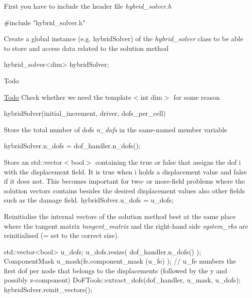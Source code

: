 \begin{DoxyItemize}
\item First you have to include the header file {\itshape hybrid\+\_\+solver.\+h} 
\begin{DoxyCode}
\textcolor{preprocessor}{#include "hybrid\_solver.h"}
\end{DoxyCode}

\item Create a global instance (e.\+g. hybrid\+Solver) of the {\itshape hybrid\+\_\+solver} class to be able to store and access data related to the solution method 
\begin{DoxyCode}
hybrid\_solver<dim> hybridSolver;
\end{DoxyCode}
 \begin{DoxyRefDesc}{Todo}
\item[\hyperlink{todo__todo000002}{Todo}]Check whether we need the template$<$int dim$>$ for some reason\end{DoxyRefDesc}

\begin{DoxyCode}
hybridSolver(initial\_increment, driver, dofs\_per\_cell)
\end{DoxyCode}

\item Store the total number of dofs {\itshape n\+\_\+dofs} in the same-\/named member variable 
\begin{DoxyCode}
hybridSolver.n\_dofs = dof\_handler.n\_dofs();
\end{DoxyCode}

\item Store an std\+::vector$<$bool$>$ containing the true or false that assigns the dof i with the displacement field. It is true when i holds a displacement value and false if it does not. This becomes important for two-\/ or more-\/field problems where the solution vectors contains besides the desired displacement values also other fields such as the damage field. hybrid\+Solver.\+u\+\_\+dofs = u\+\_\+dofs;
\item Reinitialise the internal vectors of the solution method best at the same place where the tangent matrix {\itshape tangent\+\_\+matrix} and the right-\/hand side {\itshape system\+\_\+rhs} are reinitialised (= set to the correct size). 
\begin{DoxyCode}
std::vector<bool> u\_dofs;
u\_dofs.resize( dof\_handler.n\_dofs() );
ComponentMask u\_mask(fe.component\_mask (u\_fe) ); \textcolor{comment}{// u\_fe numbers the first dof per node that belongs to the
       displacements (followed by the y and possibly z-component)}
DoFTools::extract\_dofs(dof\_handler, u\_mask, u\_dofs);
hybridSolver.reinit\_vectors();
\end{DoxyCode}


\end{DoxyItemize}
